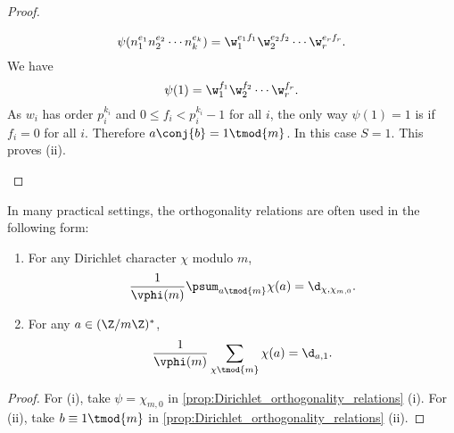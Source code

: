 \begin{proof}
\begin{enumerate}[label=(\roman*)]
        \[
          \psi(n_{1}^{e_{1}}n_{2}^{e_{2}} \cdots n_{k}^{e_{k}}) = \w_{1}^{e_{1}f_{1}}\w_{2}^{e_{2}f_{2}} \cdots \w_{r}^{e_{r}f_{r}}.
        \]
        We have
        \[
          \psi(1) = \w_{1}^{f_{1}}\w_{2}^{f_{2}} \cdots \w_{r}^{f_{r}}.
        \]
        As $w_{i}$ has order $p_{i}^{k_{i}}$ and $0 \le f_{i} < p_{i}^{k_{i}}-1$ for all $i$, the only way $\psi(1) = 1$ is if $f_{i} = 0$ for all $i$. Therefore $a\conj{b} = 1 \tmod{m}$. In this case $S = 1$. This proves (ii).
      \end{enumerate}
    \end{proof}

    In many practical settings, the orthogonality relations are often used in the following form:

    \begin{corollary}\label{cor:Dirichlet_orthogonality_relations}
    \phantom{ }
      \begin{enumerate}[label=(\roman*)]
        \item For any Dirichlet character $\chi$ modulo $m$,
        \[
          \frac{1}{\vphi(m)}\psum_{a \tmod{m}}\chi(a) = \d_{\chi,\chi_{m,0}}.
        \]
        \item For any $a \in (\Z/m\Z)^{\ast}$,
        \[
          \frac{1}{\vphi(m)}\sum_{\chi \tmod{m}}\chi(a) = \d_{a,1}.
        \]
      \end{enumerate}
    \end{corollary}
    \begin{proof}
      For (i), take $\psi = \chi_{m,0}$ in \cref{prop:Dirichlet_orthogonality_relations} (i). For (ii), take $b \equiv 1 \tmod{m}$ in \cref{prop:Dirichlet_orthogonality_relations} (ii).
    \end{proof}

